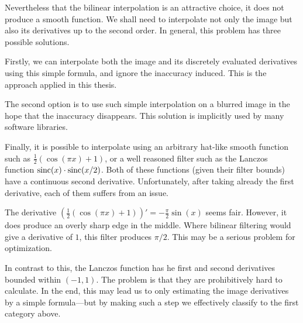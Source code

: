Nevertheless that the bilinear interpolation is an attractive choice, it does not produce a smooth function.
We shall need to interpolate not only the image but also its derivatives up to the second order.
In general, this problem has three possible solutions.

Firstly, we can interpolate both the image and its discretely evaluated derivatives using this simple formula, and ignore the inaccuracy induced.
This is the approach applied in this thesis.

The second option is to use such simple interpolation on a blurred image in the hope that the inaccuracy disappears.
This solution is implicitly used by many software libraries.

Finally, it is possible to interpolate using an arbitrary hat-like smooth function such as  $\frac 1 2 (\cos(\pi x) + 1)$, or a well reasoned filter such as the Lanczos function $\mathrm{sinc}(x) \cdot \mathrm{sinc}(x/2)$.
Both of these functions (given their filter bounds) have a continuous second derivative.
Unfortunately, after taking already the first derivative, each of them suffers from an issue.

The derivative $\left(\frac 1 2 (\cos(\pi x) + 1)\right)' = - \frac \pi 2 \sin(x)$ seems fair.
However, it does produce an overly sharp edge in the middle.
Where bilinear filtering would give a derivative of $1$, this filter produces $\pi/2$.
This may be a serious problem for optimization.

In contrast to this, the Lanczos function has he first and second derivatives bounded within $(-1, 1)$.
The problem is that they are prohibitively hard to calculate.
In the end, this may lead us to only estimating the image derivatives by a simple formula---but by making such a step we effectively classify to the first category above.
